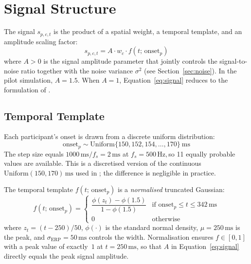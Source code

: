 \documentclass[12pt, a4paper]{article}
\begin{document}
\section{Signal Structure}\label{sec:signal}

The signal $s_{p,c,t}$ is the product of a spatial weight, a temporal
template, and an amplitude scaling factor:
%
\begin{equation}\label{eq:signal}
  s_{p,c,t} = A \cdot w_c \cdot f(t;\,\mathrm{onset}_p)
\end{equation}
%
where $A > 0$ is the signal amplitude parameter that jointly controls
the signal-to-noise ratio together with the noise variance $\sigma^2$
(see Section~\ref{sec:noise}).
In the pilot simulation, $A = 1.5$.
When $A = 1$, Equation~\eqref{eq:signal} reduces to the formulation of
\citet{Nalborczyk2025}.

\subsection{Temporal Template}\label{sec:erp}

Each participant's onset is drawn from a discrete uniform
distribution:
%
\begin{equation}\label{eq:onset}
  \mathrm{onset}_p
    \sim \mathrm{Uniform}\{150, 152, 154, \ldots, 170\}\ \text{ms}
\end{equation}
%
The step size equals $1000\,\text{ms}/f_s = 2\,\text{ms}$ at $f_s = 500\,\text{Hz},
$so 11 equally probable values are available.
This is a discretised version of the continuous
$\mathrm{Uniform}(150,170)\,\text{ms}$ used in \citet{Nalborczyk2025};
the difference is negligible in practice.

The temporal template $f(t;\,\mathrm{onset}_p)$ is a
\emph{normalised} truncated Gaussian:
%
\begin{equation}\label{eq:erp}
  f(t;\,\mathrm{onset}_p)
  =
  \begin{cases}
    \dfrac{\phi(z_t) - \phi(1.5)}{1 - \phi(1.5)}
    & \text{if } \mathrm{onset}_p \le t \le 342\,\text{ms} \\[8pt]
    0 & \text{otherwise}
  \end{cases}
\end{equation}
%
where $z_t = (t - 250)/50$, $\phi(\cdot)$ is the standard normal
density, $\mu = 250\,\text{ms}$ is the peak, and $\sigma_\text{ERP} = 50\,\text{ms}$
controls the width.
Normalisation ensures $f \in [0,1]$ with a peak value of exactly~$1$ at
$t = 250\,\text{ms}$, so that $A$ in Equation~\eqref{eq:signal} directly
equals the peak signal amplitude.
\end{document}
